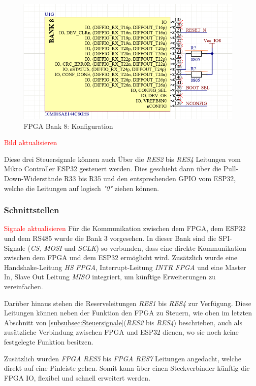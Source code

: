 \begin{figure}[H]
    \centering
    \includegraphics[width=0.8\linewidth]{Figures/Chap3/Schematics/Bank8_Admin.png}
    \caption{FPGA Bank 8: Konfiguration}
    \label{FPGA Admin}
\end{figure}
\textcolor{red}{Bild aktualisieren}

Diese drei Steuersignale können auch Über die \textit{RES2} bis \textit{RES4} Leitungen vom Mikro Controller ESP32 gesteuert werden. Dies geschieht dann über die Pull-Down-Widerstände R33 bis R35 und den entsprechenden GPIO vom ESP32, welche die Leitungen auf logisch \textit{"0"} ziehen können.

\subsubsection{Schnittstellen}
\textcolor{red}{Signale aktualisieren} \newline
Für die Kommunikation zwischen dem FPGA, dem ESP32 und dem RS485 wurde die Bank 3 vorgesehen. In dieser Bank sind die SPI-Signale (\textit{CS, MOSI} und \textit{SCLK}) so verbunden, dass eine direkte Kommunikation zwischen dem FPGA und dem ESP32 ermöglicht wird. Zusätzlich wurde eine Handshake-Leitung \textit{HS FPGA}, Interrupt-Leitung \textit{INTR FPGA} und eine Master In, Slave Out Leitung \textit{MISO} integriert, um künftige Erweiterungen zu vereinfachen.

Darüber hinaus stehen die Reserveleitungen \textit{RES1} bis \textit{RES4} zur Verfügung. Diese Leitungen können neben der Funktion den FPGA zu Steuern, wie oben im letzten Abschnitt von \ref{subsubsec:Steuersignale}(\textit{RES2} bis \textit{RES4}) beschrieben, auch als zusätzliche Verbindung zwischen FPGA und ESP32 dienen, wo sie noch keine festgelegte Funktion besitzen.

Zusätzlich wurden \textit{FPGA RES5} bis \textit{FPGA RES7} Leitungen angedacht, welche direkt auf eine Pinleiste gehen. Somit kann über einen Steckverbinder künftig die FPGA IO, flexibel und schnell erweitert werden.

